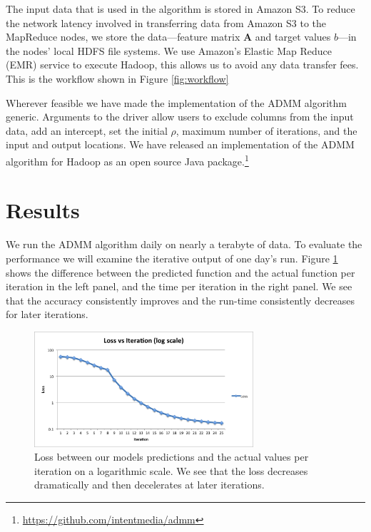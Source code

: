 \documentclass[10pt, conference, compsocconf]{IEEEtran}
\begin{document}
The input data that is used in the algorithm is stored in Amazon S3.  To reduce the network latency involved in transferring data from Amazon S3 to the MapReduce nodes, we store the data---feature matrix $\mathbf{A}$ and target values $b$---in the nodes' local HDFS file systems.  We use Amazon's Elastic Map Reduce (EMR) service to execute Hadoop, this allows us to avoid any data transfer fees.  This is the workflow shown in Figure \ref{fig:workflow}

Wherever feasible we have made the implementation of the ADMM algorithm generic.  Arguments to the driver allow users to exclude columns from the input data, add an intercept, set the initial $\rho$, maximum number of iterations, and the input and output locations. We have released an implementation of the ADMM algorithm for Hadoop as an open source Java package.\footnote{\url{https://github.com/intentmedia/admm}}

\section{Results}\label{sec:results}
We run the ADMM algorithm daily on nearly a terabyte of data.  To evaluate the performance we will examine the iterative output of one day's run.  Figure \ref{fig:iter} shows the difference between the predicted function and the actual function per iteration in the left panel, and the time per iteration in the right panel.  We see that the accuracy consistently improves and the run-time consistently decreases for later iterations.

\begin{figure}[!t]
\centering
\includegraphics[width=3.2in]{iter_rnorm_plot}
\caption{Loss between our models predictions and the actual values per iteration on a logarithmic scale.  We see that the loss decreases dramatically and then decelerates at later iterations.}
\label{fig:iter}
\end{figure}
\end{document}
